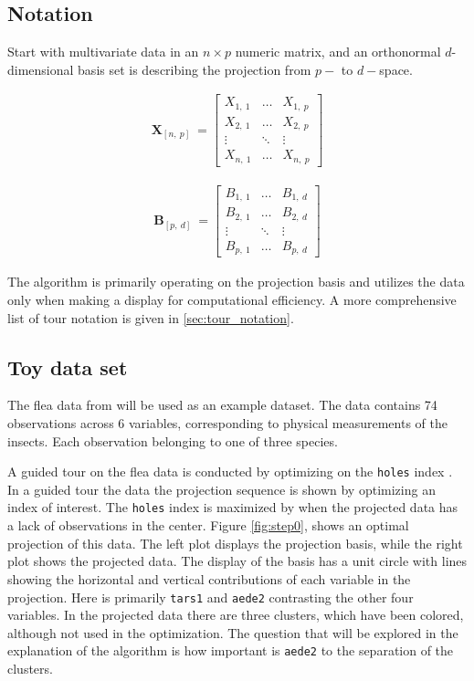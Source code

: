 \documentclass{monashthesis}
\begin{document}
\subsection{Notation}\label{notation}

Start with multivariate data in an \(n \times p\) numeric matrix, and an
orthonormal \(d\)-dimensional basis set is describing the projection
from \(p-\) to \(d-\)space.

\begin{align*}
  \textbf{X}_{[n,~p]} ~=
  \begin{bmatrix}
    X_{1,~1} & \dots  & X_{1,~p} \\
    X_{2,~1} & \dots  & X_{2,~p} \\
    \vdots   & \ddots & \vdots   \\
    X_{n,~1} & \dots  & X_{n,~p}
  \end{bmatrix}
\end{align*}

\begin{align*}
  \textbf{B}_{[p,~d]} ~=
  \begin{bmatrix}
    B_{1,~1} & \dots  & B_{1,~d} \\
    B_{2,~1} & \dots  & B_{2,~d} \\
    \vdots   & \ddots & \vdots   \\
    B_{p,~1} & \dots  & B_{p,~d}
  \end{bmatrix}
\end{align*}

The algorithm is primarily operating on the projection basis and
utilizes the data only when making a display for computational
efficiency. A more comprehensive list of tour notation is given in
\ref{sec:tour_notation}.

\subsection{Toy data set}\label{toy-data-set}

The flea data from \textcite{lubischew_use_1962} will be used as an
example dataset. The data contains 74 observations across 6 variables,
corresponding to physical measurements of the insects. Each observation
belonging to one of three species.

A guided tour on the flea data is conducted by optimizing on the
\texttt{holes} index \autocite{cook_interactive_2007}. In a guided tour
the data the projection sequence is shown by optimizing an index of
interest. The \texttt{holes} index is maximized by when the projected
data has a lack of observations in the center. Figure \ref{fig:step0},
shows an optimal projection of this data. The left plot displays the
projection basis, while the right plot shows the projected data. The
display of the basis has a unit circle with lines showing the horizontal
and vertical contributions of each variable in the projection. Here is
primarily \texttt{tars1} and \texttt{aede2} contrasting the other four
variables. In the projected data there are three clusters, which have
been colored, although not used in the optimization. The question that
will be explored in the explanation of the algorithm is how important is
\texttt{aede2} to the separation of the clusters.
\end{document}
